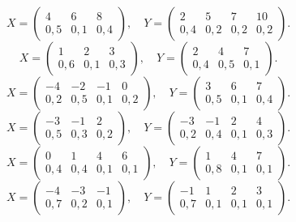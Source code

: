 $$ X = \left(\begin{array}{*{3}{c}} 4 & 6 & 8 \\ 0{,}5 & 0{,}1 & 0{,}4 \end{array}\right), \quad Y = \left(\begin{array}{*{4}{c}} 2 & 5 & 7 & 10 \\ 0{,}4 & 0{,}2 & 0{,}2 & 0{,}2 \end{array}\right). $$
$$ X = \left(\begin{array}{*{3}{c}} 1 & 2 & 3 \\ 0{,}6 & 0{,}1 & 0{,}3 \end{array}\right), \quad Y = \left(\begin{array}{*{3}{c}} 2 & 4 & 7 \\ 0{,}4 & 0{,}5 & 0{,}1 \end{array}\right). $$
$$ X = \left(\begin{array}{*{4}{c}} -4 & -2 & -1 & 0 \\ 0{,}2 & 0{,}5 & 0{,}1 & 0{,}2 \end{array}\right), \quad Y = \left(\begin{array}{*{3}{c}} 3 & 6 & 7 \\ 0{,}5 & 0{,}1 & 0{,}4 \end{array}\right). $$
$$ X = \left(\begin{array}{*{3}{c}} -3 & -1 & 2 \\ 0{,}5 & 0{,}3 & 0{,}2 \end{array}\right), \quad Y = \left(\begin{array}{*{4}{c}} -3 & -1 & 2 & 4 \\ 0{,}2 & 0{,}4 & 0{,}1 & 0{,}3 \end{array}\right). $$
$$ X = \left(\begin{array}{*{4}{c}} 0 & 1 & 4 & 6 \\ 0{,}4 & 0{,}4 & 0{,}1 & 0{,}1 \end{array}\right), \quad Y = \left(\begin{array}{*{3}{c}} 1 & 4 & 7 \\ 0{,}8 & 0{,}1 & 0{,}1 \end{array}\right). $$
$$ X = \left(\begin{array}{*{3}{c}} -4 & -3 & -1 \\ 0{,}7 & 0{,}2 & 0{,}1 \end{array}\right), \quad Y = \left(\begin{array}{*{4}{c}} -1 & 1 & 2 & 3 \\ 0{,}7 & 0{,}1 & 0{,}1 & 0{,}1 \end{array}\right). $$
